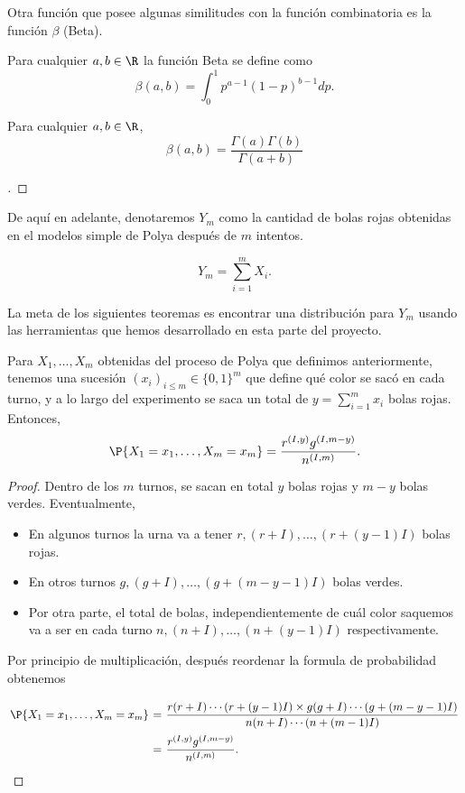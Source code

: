 Otra función que posee algunas similitudes con la función combinatoria es la función $\beta$ (Beta).

\begin{definition} Para cualquier $a,b \in \R$ la función Beta se define como
    \[ \beta(a,b) = \int_0^1 p^{a-1} (1-p)^{b-1} dp. \]
\end{definition}

\begin{theorem} Para cualquier $a,b \in \R$,
    \[ \beta(a,b) = \dfrac{\Gamma(a)\Gamma(b)}{\Gamma(a+b)} \]
\end{theorem}
\begin{proof}[]
    \vspace*{-2em}
\end{proof}

De aquí en adelante, denotaremos $Y_m$ como la cantidad de bolas rojas obtenidas en el modelos simple de Polya después de $m$ intentos.

\begin{definition}
    \[ Y_m = \sum_{i = 1}^{m} X_i. \]
\end{definition}

La meta de los siguientes teoremas es encontrar una distribución para $Y_m$ usando las herramientas que hemos desarrollado en esta parte del proyecto.

\begin{theorem}\label{polya-mass}
    Para $X_1,\ldots, X_m$ obtenidas del proceso de Polya que definimos anteriormente, tenemos una sucesión $(x_i)_{i\leq m} \in \{0,1\}^m$ que define qué color se sacó en cada turno, y a lo largo del experimento se saca un total de $y = \sum_{i = 1}^m x_i$ bolas rojas. Entonces,
    \[  \P\{X_1 = x_1,\ldots, X_m = x_m\} = \frac{r^{(I,y)} g^{(I,m-y)}}{n^{(I,m)}}. \]
\end{theorem}
\begin{proof} 
    Dentro de los $m$ turnos, se sacan en total $y$ bolas rojas y $m-y$ bolas verdes. Eventualmente, 
    \begin{itemize}
        \item En algunos turnos la urna va a tener $r,(r+I),\ldots,(r+(y-1)I)$ bolas rojas.
        \item En otros turnos $g,(g+I),\ldots,(g+(m-y-1)I)$ bolas verdes.
        \item Por otra parte, el total de bolas, independientemente de cuál color saquemos va a ser en cada turno $n, (n+I), \ldots, (n+(y-1)I)$ respectivamente.
    \end{itemize}
    Por principio de multiplicación, después reordenar la formula de probabilidad obtenemos
    \[ \everymath{\displaystyle}
    \arraycolsep=1.8pt\def\arraystretch{2.5}
    \begin{array}{rcl}
        \P\{X_1 = x_1,\ldots, X_m = x_m\} & = & \frac{r(r+I)\cdots(r+(y-1)I) \times g(g+I)\cdots(g+(m-y-1)I)}{n(n+I)\cdots(n+(m-1)I)}\\
        & = & \frac{r^{(I,y)} g^{(I,m-y)}}{n^{(I,m)}}.
    \end{array}    
     \]
\end{proof}

